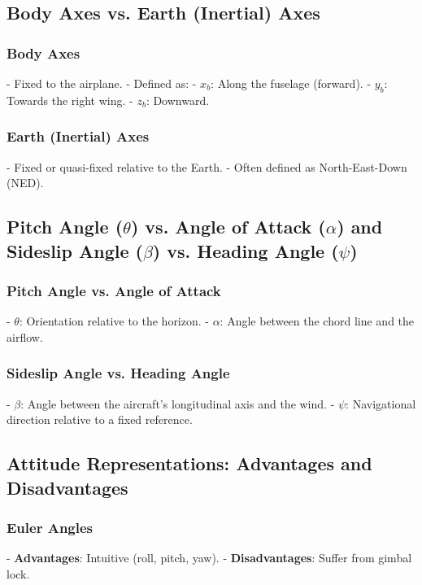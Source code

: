 \documentclass{article}
\begin{document}
\subsection{Body Axes vs. Earth (Inertial) Axes}

\subsubsection{Body Axes}
- Fixed to the airplane.
- Defined as:
  - \( x_b \): Along the fuselage (forward).
  - \( y_b \): Towards the right wing.
  - \( z_b \): Downward.

\subsubsection{Earth (Inertial) Axes}
- Fixed or quasi-fixed relative to the Earth.
- Often defined as North-East-Down (NED).

\subsection{Pitch Angle (\(\theta\)) vs. Angle of Attack (\(\alpha\)) and Sideslip Angle (\(\beta\)) vs. Heading Angle (\(\psi\))}

\subsubsection{Pitch Angle vs. Angle of Attack}
- \(\theta\): Orientation relative to the horizon.
- \(\alpha\): Angle between the chord line and the airflow.

\subsubsection{Sideslip Angle vs. Heading Angle}
- \(\beta\): Angle between the aircraft’s longitudinal axis and the wind.
- \(\psi\): Navigational direction relative to a fixed reference.

\subsection{Attitude Representations: Advantages and Disadvantages}

\subsubsection{Euler Angles}
- \textbf{Advantages}: Intuitive (roll, pitch, yaw).
- \textbf{Disadvantages}: Suffer from gimbal lock.
\end{document}
